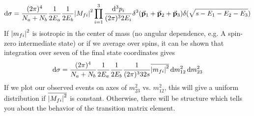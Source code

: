 \documentclass[a4paper,twoside,master.tex]{subfiles}
\begin{document}
\begin{equation}
    \dd{\sigma} = \frac{(2 \pi)^4}{N_a + N_b} \frac{1}{2 E_a} \frac{1}{2 E_b} \abs{M_{f i}}^2 \prod_{i=1}^{3} \frac{\dd[3]{p_i}}{(2 \pi)^3 2 E_i} \delta^3(\va{p}_1 + \va{p}_2 + \va{p}_3) \delta(\sqrt{s - E_1 - E_2 - E_3})
\end{equation}
If $ \abs{m_{f i}}^2 $ is isotropic in the center of mass (no angular dependence, e.g. A spin-zero intermediate state) or if we average over spins, it can be shown that integration over seven of the final state coordinates gives
\begin{equation}
    \dd{\sigma} = \frac{(2 \pi)^4}{N_a + N_b} \frac{1}{2 E_a} \frac{1}{2 E_b} \frac{1}{(2 \pi)^3 32 s} \overline{\abs{m_{f i}}^2} \dd{m_{12}^2} \dd{m_{23}^2}
\end{equation}
If we plot our observed events on axes of $ m_{23}^2 $ vs. $ m_{12}^2 $, this will give a uniform distribution if $ \overline{\abs{M_{f i}}^2} $ is constant. Otherwise, there will be structure which tells you about the behavior of the transition matrix element.
\end{document}
